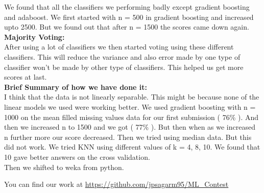 \documentclass{article}
\begin{document}
We found that all the classifiers we performing badly except gradient boosting and adaboost. We first started with n = 500 in gradient boosting and increased upto 2500. But we found out that after n = 1500 the scores came down again.\\

{\bf Majority Voting:}\\

After using a lot of classifiers we then started voting using these different classifiers. This will reduce the variance and also error made by one type of classifier won't be made by other type of classifiers. This helped us get more scores at last.\\
 
{\bf Brief Summary of how we have done it:}\\

I think that the data is not linearly separable. This might be because none of the linear models we used were working better.
We used gradient boosting with n = 1000 on the mean filled missing values data for our first submission ( 76\% ). And then we increased n to 1500 and we got ( 77\% ). But then when as we increased n further more our score decreased. Then we tried using median data. But this did not work. We tried KNN using different values of k = 4, 8, 10. We found that 10 gave better answers on the cross validation.\\

Then we shifted to weka from python.

You can find our work at \url{https://github.com/jpsagarm95/ML_Contest}
\end{document}
